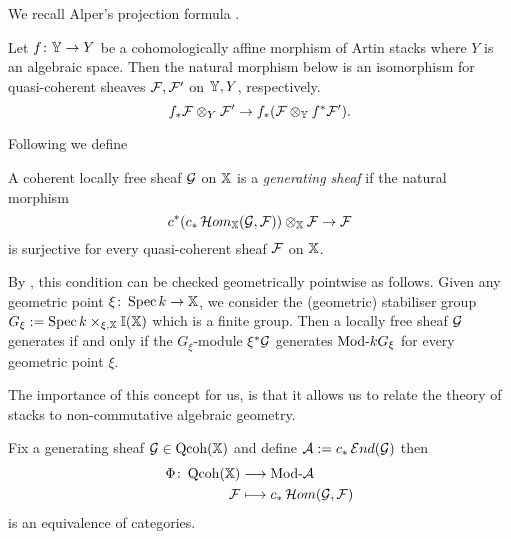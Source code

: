 \documentclass[12pt]{amsart}
\begin{document}
We recall Alper's projection formula \cite[Proposition~4.5]{Alp}.
\begin{proposition}   \label{prop:projection}
Let $f \colon \mathbb{Y} \to Y$ be a cohomologically affine morphism of Artin stacks where $Y$ is an algebraic space. Then the natural morphism below is an isomorphism for quasi-coherent sheaves $\mathcal{F}, \mathcal{F}'$ on $\mathbb{Y}, Y$, respectively.
$$ f_* \mathcal{F} \otimes_{Y} \mathcal{F}' \to f_* (\mathcal{F} \otimes_{\mathbb{Y}} f^* \mathcal{F}').$$
\end{proposition}

Following \cite{OS} we define
\begin{definition}
A coherent locally free sheaf $\mathcal{G}$ on $\mathbb{X}$ is a {\em generating sheaf} if the natural morphism
$$ c^*(c_*\mathop{{\mathcal{H}}om}\nolimits_{\mathbb{X}}(\mathcal{G}, \mathcal{F})) \otimes_{\mathbb{X}} \mathcal{F} \to \mathcal{F}$$
is surjective for every quasi-coherent sheaf $\mathcal{F}$ on $\mathbb{X}$. 
\end{definition}
By \cite[Theorem~5.2]{OS}, this condition can be checked geometrically pointwise as follows. Given any geometric point $\xi \colon \operatorname{Spec} k \to \mathbb{X}$, we consider the (geometric) stabiliser group $G_{\xi} := \operatorname{Spec} k \times_{\xi, \mathbb{X}} \mathbb{I}(\mathbb{X})$ which is a finite group. Then a locally free sheaf $\mathcal{G}$ generates if and only if the $G_{\xi}$-module $\xi^* \mathcal{G}$ generates $\textup{Mod-} kG_{\xi}$ for every geometric point $\xi$. 


The importance of this concept for us, is that it allows us to relate the theory of stacks to non-commutative algebraic geometry. 
\begin{proposition} \label{prop:Morita}
Fix a generating sheaf $\mathcal{G} \in \operatorname{Qcoh}(\mathbb{X})$ and define $\mathcal{A} := c_* \mathop{{\mathcal{E}}nd}\nolimits (\mathcal{G})$ then 
\begin{align*}
\Phi \colon \operatorname{Qcoh} (\mathbb{X}) &\longrightarrow \textup{Mod-}\mathcal{A} \\
 \mathcal{F} & \longmapsto c_* \mathop{{\mathcal{H}}om}\nolimits(\mathcal{G}, \mathcal{F})
\end{align*}
is an equivalence of categories.
\end{proposition}
\end{document}
